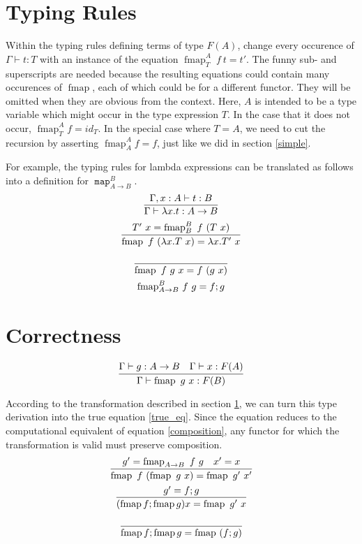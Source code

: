 \documentclass[proof]{article}
\newcommand{\entail}{\vdash}
\newcommand{\map}{\ensuremath{\mathop{\mathtt{map}}}}
\newcommand{\fmap}{\mathop{\mathrm{fmap}}}
\begin{document}
\begin{multicols}{2}
\section{Typing Rules}\label{complicated}
\vspace{-\parskip}\hspace*{\parindent}Within the typing rules defining terms of type $F(A)$, change every occurence of $\Gamma \entail t : T$ with an instance of the equation $\fmap^A_T~f~t = t'$. The funny sub- and superscripts are needed because the resulting equations could contain many occurences of $\fmap$, each of which could be for a different functor. They will be omitted when they are obvious from the context. Here, $A$ is intended to be a type variable which might occur in the type expression $T$. In the case that it does not occur, $\fmap^A_T f = id_T$. In the special case where $T=A$, we need to cut the recursion by asserting $\fmap^A_A f = f$, just like we did in section \ref{simple}.

For example, the typing rules for lambda expressions can be translated as follows into a definition for $\map^B_{A \rightarrow B}$.
\begin{subequations}
\begin{gather}
\infer{\Gamma \entail \lambda x. t : A \rightarrow B}{\Gamma, x : A \entail t : B}\\
\infer{\fmap~f~(\lambda x. T~x) = \lambda x. T'~x}{T'~x = \fmap^B_B~f~(T~x)}\\
\infer{\fmap~f~g~x = f~(g~x)}{\vphantom{|}}\\
{\fmap}^B_{A \rightarrow B}~f~g = f;g
\end{gather}
\end{subequations}

\section{Correctness}\label{proof}
\vspace{-\parskip}\hspace*{\parindent}
\begin{equation}\label{type_deriv}
\infer{\Gamma \entail \fmap~g~x : F(B)}{\Gamma \entail g : A \rightarrow B & \Gamma \entail x : F(A)}
\end{equation}

According to the transformation described in section \ref{complicated}, we can turn this type derivation into the true equation \ref{true_eq}. Since the equation reduces to the computational equivalent of equation \ref{composition}, any functor for which the transformation is valid must preserve composition.
\begin{subequations}
\begin{gather}
\label{true_eq}
\infer{\fmap~f~(\fmap~g~x) = \fmap~g'~x'}{g' = \fmap_{A \rightarrow B}~f~g & x' = x}\\
\infer{(\fmap f;\fmap g) x = \fmap~g'~x}{g' = f;g}\\
\label{comp_preserv}
\infer{\fmap f;\fmap g = \fmap~(f;g)}{\vphantom{|}}
\end{gather}
\end{subequations}


\end{multicols}
\end{document}
